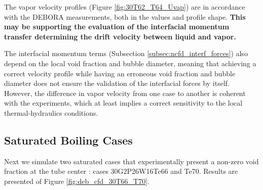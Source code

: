 \npar

The vapor velocity profiles (Figure \ref{fig:30T62_T64_Uvap}) are in accordance with the DEBORA measurements, both in the values and profile shape. \textbf{This may be supporting the evaluation of the interfacial momentum transfer determining the drift velocity between liquid and vapor.}

\begin{remark*}{}
The interfacial momentum terms (Subsection \ref{subsec:ncfd_interf_forces}) also depend on the local void fraction and bubble diameter, meaning that achieving a correct velocity profile while having an erroneous void fraction and bubble diameter does not ensure the validation of the interfacial forces by itself. However, the difference in vapor velocity from one case to another is coherent with the experiments, which at least implies a correct sensitivity to the local thermal-hydraulics conditions.
\end{remark*}


\subsection{Saturated Boiling Cases}

Next we simulate two saturated cases that experimentally present a non-zero void fraction at the tube center : cases 30G2P26W16Te66 and Te70. Results are presented of Figure \ref{fig:deb_cfd_30T66_T70}.

